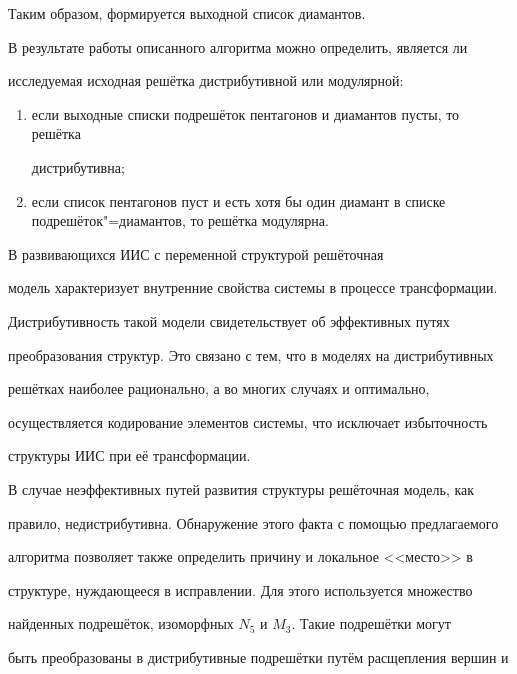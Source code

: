 Таким образом, формируется выходной список диамантов.



В результате работы описанного алгоритма можно определить, является ли

исследуемая исходная решётка дистрибутивной или модулярной:

\begin{enumerate}

\item если выходные списки подрешёток пентагонов и диамантов пусты, то решётка

дистрибутивна;



\item если список пентагонов пуст и есть хотя бы один диамант в списке подрешёток"=диамантов, то решётка модулярна.



\end{enumerate}





 В развивающихся ИИС с переменной структурой решёточная

модель характеризует внутренние свойства системы в процессе трансформации.

Дистрибутивность такой модели свидетельствует об эффективных путях

преобразования структур. Это связано с тем, что в моделях на дистрибутивных

решётках наиболее рационально, а во многих случаях и оптимально,

осуществляется кодирование элементов системы, что исключает избыточность

структуры ИИС при её трансформации.



В случае неэффективных путей развития структуры решёточная модель, как

правило, недистрибутивна. Обнаружение этого факта с помощью предлагаемого

алгоритма позволяет также определить причину и локальное <<место>> в

структуре, нуждающееся в исправлении. Для этого используется множество

найденных подрешёток, изоморфных $N_5$ и $M_3$. Такие подрешётки могут

быть преобразованы в дистрибутивные подрешётки путём расщепления вершин и

